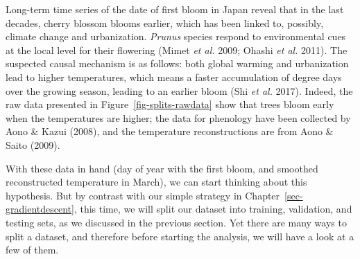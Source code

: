 \documentclass[
  letterpaper,
]{scrbook}
\begin{document}
Long-term time series of the date of first bloom in Japan reveal that in
the last decades, cherry blossom blooms earlier, which has been linked
to, possibly, climate change and urbanization. \emph{Prunus} species
respond to environmental cues at the local level for their flowering
(Mimet \emph{et al.} 2009; Ohashi \emph{et al.} 2011). The suspected
causal mechanism is as follows: both global warming and urbanization
lead to higher temperatures, which means a faster accumulation of degree
days over the growing season, leading to an earlier bloom (Shi \emph{et
al.} 2017). Indeed, the raw data presented in
Figure~\ref{fig-splits-rawdata} show that trees bloom early when the
temperatures are higher; the data for phenology have been collected by
Aono \& Kazui (2008), and the temperature reconstructions are from Aono
\& Saito (2009).

\begin{figure}[bt]



\end{figure}%

With these data in hand (day of year with the first bloom, and smoothed
reconstructed temperature in March), we can start thinking about this
hypothesis. But by contrast with our simple strategy in
Chapter~\ref{sec-gradientdescent}, this time, we will split our dataset
into training, validation, and testing sets, as we discussed in the
previous section. Yet there are many ways to split a dataset, and
therefore before starting the analysis, we will have a look at a few of
them.
\end{document}
